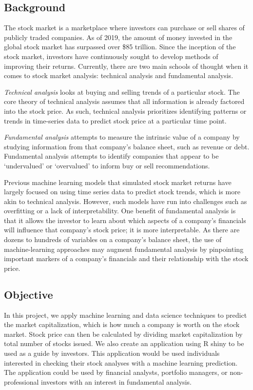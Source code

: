 \documentclass[11pt,]{article}
\begin{document}
\hypertarget{background}{%
\subsection{Background}\label{background}}

The stock market is a marketplace where investors can purchase or sell
shares of publicly traded companies. As of 2019, the amount of money
invested in the global stock market has surpassed over \$85 trillion.
Since the inception of the stock market, investors have continuously
sought to develop methods of improving their returns. Currently, there
are two main schools of thought when it comes to stock market analysis:
technical analysis and fundamental analysis.

\emph{Technical analysis} looks at buying and selling trends of a
particular stock. The core theory of technical analysis assumes that all
information is already factored into the stock price. As such, technical
analysis prioritizes identifying patterns or trends in time-series data
to predict stock price at a particular time point.

\emph{Fundamental analysis} attempts to measure the intrinsic value of a
company by studying information from that company's balance sheet, such
as revenue or debt. Fundamental analysis attempts to identify companies
that appear to be `undervalued' or `overvalued' to inform buy or sell
recommendations.

Previous machine learning models that simulated stock market returns
have largely focused on using time series data to predict stock trends,
which is more akin to technical analysis. However, such models have run
into challenges such as overfitting or a lack of interpretability. One
benefit of fundamental analysis is that it allows the investor to learn
about which aspects of a company's financials will influence that
company's stock price; it is more interpretable. As there are dozens to
hundreds of variables on a company's balance sheet, the use of
machine-learning approaches may augment fundamental analysis by
pinpointing important markers of a company's financials and their
relationship with the stock price.

\hypertarget{objective}{%
\subsection{Objective}\label{objective}}

In this project, we apply machine learning and data science techniques
to predict the market capitalization, which is how much a company is
worth on the stock market. Stock price can then be calculated by
dividing market capitalization by total number of stocks issued. We also
create an application using R shiny to be used as a guide by investors.
This application would be used individuals interested in checking their
stock analyses with a machine learning prediction. The application could
be used by financial analysts, portfolio managers, or non-professional
investors with an interest in fundamental analysis.
\end{document}
